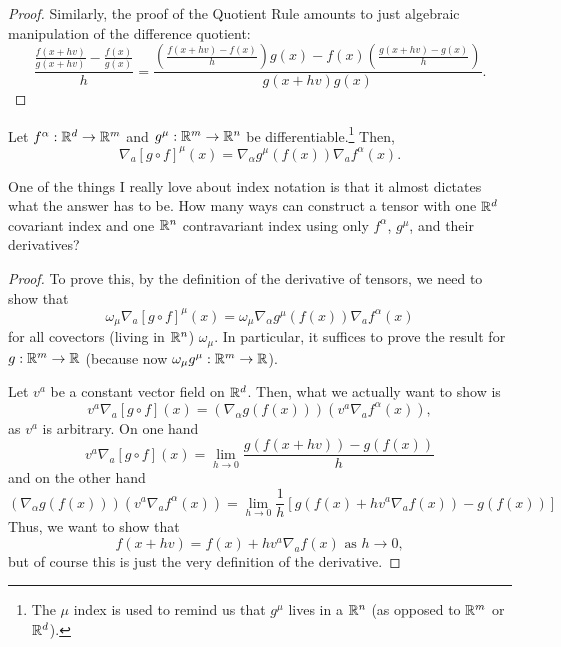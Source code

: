 \begin{prp}
\begin{proof}
Similarly, the proof of the Quotient Rule amounts to just algebraic manipulation of the difference quotient:
\begin{equation}
\frac{\frac{f(x+hv)}{g(x+hv)}-\frac{f(x)}{g(x)}}{h}=\frac{\left( \frac{f(x+hv)-f(x)}{h}\right) g(x)-f(x)\left( \frac{g(x+hv)-g(x)}{h}\right)}{g(x+hv)g(x)}.
\end{equation}
\end{proof}
\end{prp}
\begin{prp}\label{ChainRule}
Let $f^\alpha :\mathbb{R} ^d\rightarrow \mathbb{R} ^m$ and $g^\mu :\mathbb{R} ^m\rightarrow \mathbb{R} ^n$ be differentiable.\footnote{The $\mu$ index is used to remind us that $g^\mu$ lives in a $\mathbb{R} ^n$ (as opposed to $\mathbb{R} ^m$ or $\mathbb{R} ^d$).}  Then,
\begin{equation}
\nabla _a[g\circ f]^\mu (x)=\nabla _\alpha g^\mu (f(x))\nabla _af^\alpha (x).
\end{equation}
\begin{rmk}
One of the things I really love about index notation is that it almost dictates what the answer has to be.  How many ways can construct a tensor with one $\mathbb{R} ^d$ covariant index and one $\mathbb{R} ^n$ contravariant index using only $f^\alpha$, $g^\mu$, and their derivatives?
\end{rmk}
\begin{proof}
To prove this, by the definition of the derivative of tensors, we need to show that
\begin{equation}
\omega _\mu \nabla _a[g\circ f]^\mu (x)=\omega _\mu \nabla _\alpha g^\mu (f(x))\nabla _af^\alpha (x)
\end{equation}
for all covectors (living in $\mathbb{R} ^n$) $\omega _\mu$.  In particular, it suffices to prove the result for $g:\mathbb{R} ^m\rightarrow \mathbb{R}$ (because now $\omega _\mu g^\mu :\mathbb{R} ^m\rightarrow \mathbb{R}$).

Let $v^a$ be a constant vector field on $\mathbb{R} ^d$.  Then, what we actually want to show is
\begin{equation}
v^a\nabla _a[g\circ f](x)=\left( \nabla _\alpha g(f(x))\right) \left( v^a\nabla _af^\alpha (x)\right) ,
\end{equation}
as $v^a$ is arbitrary.  On one hand
\begin{equation}\label{5.2.18}
v^a\nabla _a[g\circ f](x)=\lim _{h\to 0}\frac{g\left( f(x+hv)\right) -g(f(x))}{h}
\end{equation}
and on the other hand
\begin{equation}
\left( \nabla _\alpha g(f(x))\right) \left( v^a\nabla _af^\alpha (x)\right) =\lim _{h\to 0}\frac{1}{h}\left[ g\left( f(x)+hv^a\nabla _af(x)\right) -g(f(x))\right]
\end{equation}
Thus, we want to show that
\begin{equation}
f(x+hv)=f(x)+hv^a\nabla _af(x)\text{ as }h\to 0,
\end{equation}
but of course this is just the very definition of the derivative.
\end{proof}
\end{prp}


